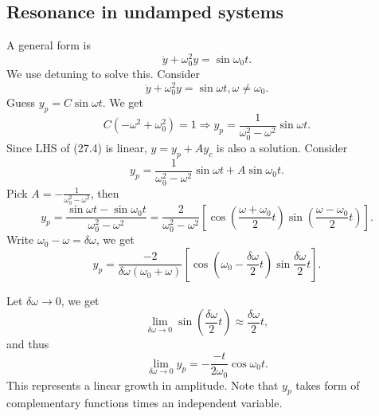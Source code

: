 \documentclass[10pt]{article}
\begin{document}
      \subsection{Resonance in undamped systems}
      A general form is
      \begin{equation}
        \ddot{y}+\omega_0^2 y = \sin \omega_0 t.
      \end{equation}
      We use detuning to solve this. Consider 
      \begin{equation}
        \ddot{y}+\omega_0^2 y = \sin \omega t, \omega\neq \omega_0.
      \end{equation}
      Guess $ y_p=C \sin \omega t $. We get 
      \[
          C(-\omega^2+\omega_0^2)=1 \Longrightarrow y_p = \frac{1}{\omega_0^2-\omega^2}\sin \omega t
      .\]
      Since LHS of (27.4) is linear, $ y=y_p+Ay_c $ is also a solution. Consider 
      \[
          y_p = \frac{1}{\omega_0^2-\omega^2}\sin \omega t + A \sin \omega_0 t
      .\]
      Pick $A=-\frac{1}{\omega_0^2-\omega^2}$, then 
      \[
          y_p = \frac{\sin \omega t-\sin \omega_0 t}{\omega_0^2-\omega^2} = \frac{2}{\omega_0^2-\omega^2}\left[ \cos \left( \frac{\omega+\omega_0}{2}t \right)\sin \left( \frac{\omega-\omega_0}{2}t \right) \right]
      .\] 
      Write $ \omega_0-\omega = \delta \omega $, we get 
      \[
          y_p = \frac{-2}{\delta \omega(\omega_0+\omega)}\left[ \cos \left( \omega_0-\frac{\delta \omega}{2}t \right) \sin \frac{\delta \omega}{2}t \right]
      .\]
      \begin{center}
      \end{center}
      Let $ \delta \omega\to 0 $, we get 
      \[
          \lim_{\delta \omega \to 0} \sin \left( \frac{\delta \omega}{2}t \right) \approx \frac{\delta \omega}{2}t
      ,\]
      and thus 
      \[
          \lim_{\delta \omega \to 0} y_p = -\frac{-t}{2\omega_0}\cos \omega_0 t
      .\]
      This represents a linear growth in amplitude. Note that $y_p$ takes form of complementary functions times an independent variable.
\end{document}
